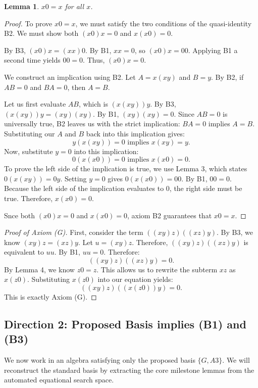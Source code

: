 \documentclass[11pt, a4paper]{article}
\newtheorem{lemma}{Lemma}
\begin{document}
\begin{lemma}
$x0 = x$ for all $x$.
\end{lemma}
\begin{proof}
To prove $x0 = x$, we must satisfy the two conditions of the quasi-identity B2. We must show both $(x0)x = 0$ and $x(x0) = 0$.

\vspace{0.5em}
\noindent 
By B3, $(x0)x = (xx)0$. By B1, $xx = 0$, so $(x0)x = 00$. Applying B1 a second time yields $00 = 0$. Thus, $(x0)x = 0$.

\vspace{0.5em}
\noindent 
We construct an implication using B2. Let $A = x(xy)$ and $B = y$. By B2, if $AB = 0$ and $BA = 0$, then $A = B$.

\vspace{0.5em}
\noindent 
Let us first evaluate $AB$, which is $(x(xy))y$. By B3, $(x(xy))y = (xy)(xy)$. By B1, $(xy)(xy) = 0$. Since $AB = 0$ is universally true, B2 leaves us with the strict implication: $BA = 0$ implies $A = B$. Substituting our $A$ and $B$ back into this implication gives:
\[ y(x(xy)) = 0 \text{ implies } x(xy) = y. \]
Now, substitute $y = 0$ into this implication:
\[ 0(x(x0)) = 0 \text{ implies } x(x0) = 0. \]
To prove the left side of the implication is true, we use Lemma 3, which states $0(x(xy)) = 0y$. Setting $y = 0$ gives $0(x(x0)) = 00$. By B1, $00 = 0$. Because the left side of the implication evaluates to $0$, the right side must be true. Therefore, $x(x0) = 0$.

\vspace{0.5em}
\noindent Snce both $(x0)x = 0$ and $x(x0) = 0$, axiom B2 guarantees that $x0 = x$.
\end{proof}

\begin{proof}[Proof of Axiom (G)]
First, consider the term $((xy)z)((xz)y)$. By B3, we know $(xy)z = (xz)y$. Let $u = (xy)z$. Therefore, $((xy)z)((xz)y)$ is equivalent to $uu$. By B1, $uu = 0$. Therefore:
\[ ((xy)z)((xz)y) = 0. \]
By Lemma 4, we know $z0 = z$. This allows us to rewrite the subterm $xz$ as $x(z0)$. Substituting $x(z0)$ into our equation yields:
\[ ((xy)z)((x(z0))y) = 0. \]
This is exactly Axiom (G).
\end{proof}

\subsection{Direction 2: Proposed Basis implies (B1) and (B3)}
We now work in an algebra satisfying only the proposed basis $\{G, A3\}$. We will reconstruct the standard basis by extracting the core milestone lemmas from the automated equational search space.
\end{document}
